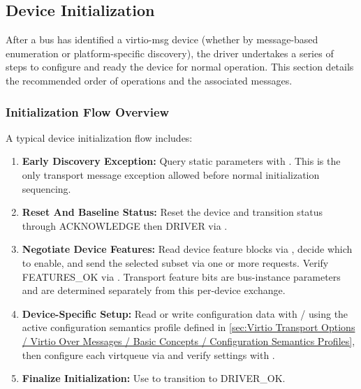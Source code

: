 \subsection{Device Initialization}
\label{sec:Virtio Transport Options / Virtio Over Messages / Device Initialization}

After a bus has identified a virtio-msg device (whether by message-based
enumeration or platform-specific discovery), the driver undertakes a series of
steps to configure and ready the device for normal operation. This section
details the recommended order of operations and the associated messages.

\subsubsection{Initialization Flow Overview}
\label{sec:Virtio Transport Options / Virtio Over Messages / Device Initialization / Overview}

A typical device initialization flow includes:
\begin{enumerate}
  \item \textbf{Early Discovery Exception:}
    Query static parameters with . This is the only
    transport message exception allowed before normal initialization sequencing.
  \item \textbf{Reset And Baseline Status:}
    Reset the device and transition status through ACKNOWLEDGE then DRIVER via
    .
  \item \textbf{Negotiate Device Features:}
    Read device feature blocks via , decide which
    to enable, and send the selected subset via one or more
     requests. Verify FEATURES\_OK via
    . Transport feature bits are bus-instance
    parameters and are determined separately from this per-device exchange.
  \item \textbf{Device-Specific Setup:}
    Read or write configuration data with
    / using the active configuration
    semantics profile defined in
    \ref{sec:Virtio Transport Options / Virtio Over Messages / Basic Concepts / Configuration Semantics Profiles},
    then configure each virtqueue via  and verify settings
    with .
  \item \textbf{Finalize Initialization:}
    Use  to transition to DRIVER\_OK.
\end{enumerate}

